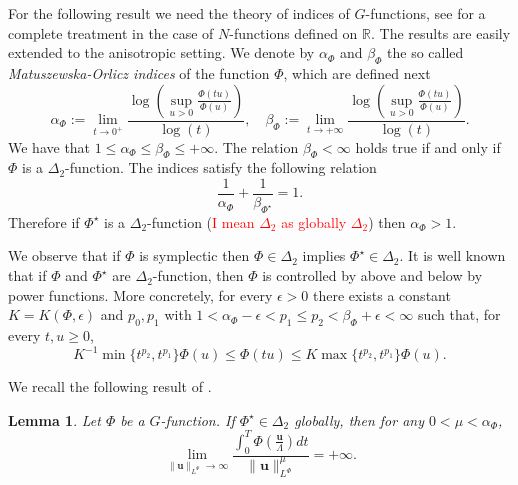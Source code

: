 \documentclass[twoside]{article}
\newtheorem{lem}[thm]{Lemma}
\theoremstyle{remark}
\newcommand{\orlnor}{\|_{L^{\Phi}}}
\renewcommand{\b}[1]{\boldsymbol{#1}}
\newcommand{\rr}{\mathbb{R}}
\renewcommand{\leq}{\leqslant}
\renewcommand{\geq}{\geqslant}
\newcommand{\Phie}{\Phi^{\star}}
\begin{document}
 
For the following result we need the theory of indices of $G$-functions, see \cite{fiorenza1997indices,Maligranda} for a complete treatment in the case of $N$-functions defined on $\rr$. The results are easily extended to the anisotropic setting.
We denote by $\alpha_{\Phi}$ and $\beta_{\Phi}$ the so called  \emph{Matuszewska-Orlicz indices} of the function $\Phi$, which are defined next
\begin{equation}\label{eq:MO_indices}
    \alpha_{\Phi}:=\lim\limits_{t\to 0^{+}}\frac{\log \left (\sup\limits_{u>0}\frac{\Phi(t u)}{\Phi(u)} \right ) }{\log(t)},\quad
    \beta_{\Phi}:=\lim\limits_{t\to +\infty}\frac{\log \left  (\sup\limits_{u>0}\frac{\Phi(t u)}{\Phi(u)}\right )}{\log(t)}.
\end{equation}
We have that $1\leq \alpha_{\Phi}\leq \beta_{\Phi}\leq +\infty$. The relation $\beta_{\Phi}<\infty$ holds true if and only if $\Phi$ is a
$\Delta_2$-function. The indices satisfy the following relation
\begin{equation}\label{inv_indices}
    \frac{1}{\alpha_{\Phi}}+\frac{1}{\beta_{\Phie}}=1.
\end{equation}
Therefore if $\Phie$ is a $\Delta_2$-function (\textcolor{red}{I mean $\Delta_2$ as globally $\Delta_2$}) then $\alpha_{\Phi}>1$. 


We observe that if $\Phi$ is symplectic then $\Phi\in\Delta_2$ implies $\Phie\in\Delta_2$.  It is well known   that if $\Phi$  and $\Phie$ are $\Delta_2$-function, then $\Phi$ is controlled by above and below
 by power functions.  More concretely, for every $\epsilon>0$ there exists a
constant $K=K(\Phi,\epsilon)$ and $p_0,p_1$ with $1<\alpha_{\Phi}-\epsilon<p_1\leq p_2<\beta_{\Phi}+\epsilon<\infty$ such that, for every $t,u\geq 0$,
\begin{equation}\label{delta2-potencias}
    K^{-1}\min\big\{t^{p_2},t^{p_1} \big\}\Phi(u)\leq \Phi(t u)\leq
    K\max\big\{t^{p_2},t^{p_1} \big\}\Phi(u).
\end{equation}





We recall the following result of \cite{ABGMS2015}.

\begin{lem}\label{lem_coer} Let $\Phi$ be a  $G$-function. If $\Phie \in \Delta_2$ globally, then  for any $0<\mu<\alpha_{\Phi}$,
\begin{equation}\label{coer_modular} \lim\limits_{\|\b{u}\orlnor \to \infty} \frac{\int_0^T\Phi\left(\frac{\b{u}}{\Lambda}\right)dt}{\|\b{u}\orlnor^{\mu}}=+\infty.
\end{equation}

\end{lem}
\end{document}

